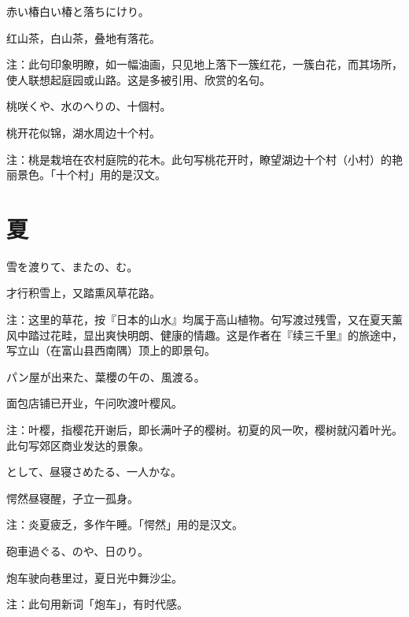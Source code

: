 \begin{haiku}
    {\FH 赤い椿白い椿と落ちにけり。}

    {\FK 红山茶，白山茶，叠地有落花。}

    {\FT 注：此句印象明瞭，如一幅油画，只见地上落下一簇红花，一簇白花，而其场所，使人联想起庭园或山路。这是多被引用、欣赏的名句。}
\end{haiku}

\begin{haiku}
    {\FH 桃咲くや、水のへりの、十個村。}

    {\FK 桃开花似锦，湖水周边十个村。}

    {\FT 注：桃是栽培在农村庭院的花木。此句写桃花开时，瞭望湖边十个村（小村）的艳丽景色。「十个村」用的是汉文。}
\end{haiku}

\section{\FK 夏}

\setcounter{haikucounter}{0}

\begin{haiku}
    {\FH 雪を渡りて、またの、む。}

    {\FK 才行积雪上，又踏熏风草花路。}

    {\FT 注：这里的草花，按『日本的山水』均属于高山植物。句写渡过残雪，又在夏天薰风中踏过花畦，显出爽快明朗、健康的情趣。这是作者在『续三千里』的旅途中，写立山（在富山县西南隅）顶上的即景句。}
\end{haiku}

\begin{haiku}
    {\FH パン屋が出来た、葉櫻の午の、風渡る。}

    {\FK 面包店铺已开业，午问吹渡叶樱风。}

    {\FT 注：叶樱，指樱花开谢后，即长满叶子的樱树。初夏的风一吹，樱树就闪着叶光。此句写郊区商业发达的景象。}
\end{haiku}

\begin{haiku}
    {\FH {}として、昼寝さめたる、一人かな。}

    {\FK 愕然昼寝醒，孑立一孤身。}

    {\FT 注：炎夏疲乏，多作午睡。「愕然」用的是汉文。}
\end{haiku}

\begin{haiku}
    {\FH 砲車過ぐる、のや、日のり。}

    {\FK 炮车驶向巷里过，夏日光中舞沙尘。}

    {\FT 注：此句用新词「炮车」，有时代感。}
\end{haiku}

